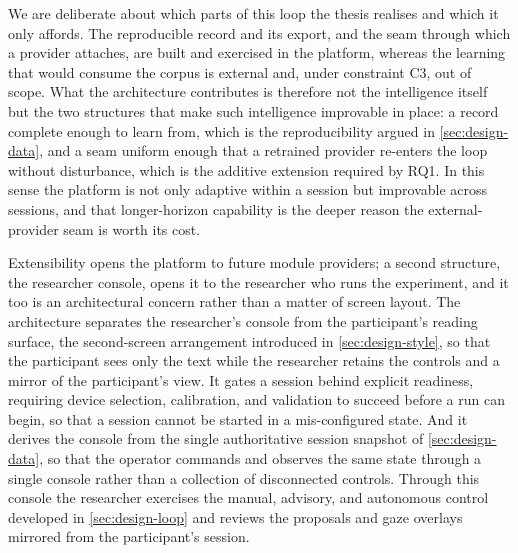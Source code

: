 

We are deliberate about which parts of this loop the thesis realises and which it only affords.
The reproducible record and its export, and the seam through which a provider attaches, are built and exercised in the platform, whereas the learning that would consume the corpus is external and, under constraint C3, out of scope.
What the architecture contributes is therefore not the intelligence itself but the two structures that make such intelligence improvable in place: a record complete enough to learn from, which is the reproducibility argued in \cref{sec:design-data}, and a seam uniform enough that a retrained provider re-enters the loop without disturbance, which is the additive extension required by RQ1.
In this sense the platform is not only adaptive within a session but improvable across sessions, and that longer-horizon capability is the deeper reason the external-provider seam is worth its cost.

Extensibility opens the platform to future module providers; a second structure, the researcher console, opens it to the researcher who runs the experiment, and it too is an architectural concern rather than a matter of screen layout.
The architecture separates the researcher's console from the participant's reading surface, the second-screen arrangement introduced in \cref{sec:design-style}, so that the participant sees only the text while the researcher retains the controls and a mirror of the participant's view.
It gates a session behind explicit readiness, requiring device selection, calibration, and validation to succeed before a run can begin, so that a session cannot be started in a mis-configured state.
And it derives the console from the single authoritative session snapshot of \cref{sec:design-data}, so that the operator commands and observes the same state through a single console rather than a collection of disconnected controls.
Through this console the researcher exercises the manual, advisory, and autonomous control developed in \cref{sec:design-loop} and reviews the proposals and gaze overlays mirrored from the participant's session.

